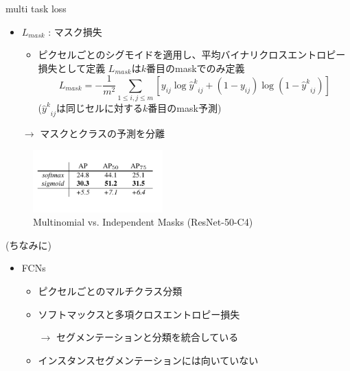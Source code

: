 \documentclass[aspectratio=169, dvipdfmx, 11pt]{beamer}
\begin{document}
\begin{frame}{multi task loss}
    \begin{itemize}
        \item $L_{mask}$ : マスク損失
        \begin{itemize}
            \item ピクセルごとのシグモイドを適用し、平均バイナリクロスエントロピー損失として定義
            $L_{mask}$は$k$番目のmaskでのみ定義 \\
            \begin{equation*}
                L_{mask} = - \frac{1}{m^2} \sum_{1 \leq i, j \leq m} [y_{ij} \log {{\hat{y}}^k}_{ij} + (1 - y_{ij}) \log (1 - {{\hat{y}}^k}_{ij})]
            \end{equation*}
            \centering
            (${{\hat{y}}^k}_{ij}$は同じセルに対する$k$番目のmask予測)
        \end{itemize}
        \item[$\rightarrow$] マスクとクラスの予測を分離
    \end{itemize}

    \begin{figure}[htbp]
        \centering
		\includegraphics[width=5cm]{./figures/mask2.png}
        \caption{Multinomial vs. Independent Masks (ResNet-50-C4)}
    \end{figure}
\end{frame}

\begin{frame}{(ちなみに)}
    \begin{itemize}
        \item FCNs \\
        \begin{itemize}
            \item ピクセルごとのマルチクラス分類 \\
            \item ソフトマックスと多項クロスエントロピー損失 \\
            \item[$\rightarrow$] セグメンテーションと分類を統合している \\
            \item インスタンスセグメンテーションには向いていない \\
        \end{itemize}
    \end{itemize}
\end{frame}
\end{document}
